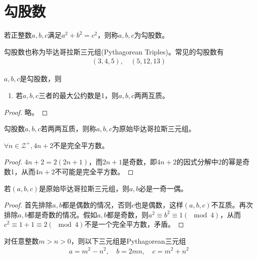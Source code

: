 
\chapter{勾股数}
\label{chap:pythagorean_triples}

\begin{definition}[勾股数]
  若正整数$a,b,c$满足$a^2+b^2=c^2$，则称$a,b,c$为勾股数。
\end{definition}

勾股数也称为毕达哥拉斯三元组(Pythagorean Triples)。常见的勾股数有
\begin{align*}
  (3,4,5),\quad (5,12,13)
\end{align*}

\begin{property}
  $a,b,c$是勾股数，则
  \begin{enumerate}
  \item 若$a,b,c$三者的最大公约数是1，则$a,b,c$两两互质。
  \end{enumerate}
\end{property}

\begin{proof}
  略。
\end{proof}

\begin{definition}
  勾股数$a,b,c$若两两互质，则称$a,b,c$为原始毕达哥拉斯三元组。
\end{definition}

\begin{lemma}
  $\forall n\in\mathcal{Z}^+, 4n+2$不是完全平方数。
\end{lemma}

\begin{proof}
  $4n+2=2(2n+1)$，而$2n+1$是奇数，即$4n+2$的因式分解中2的幂是奇数1，从而$4n+2$不可能是完全平方数。
\end{proof}

\begin{lemma}
  若$(a,b,c)$是原始毕达哥拉斯三元组，则$a,b$必是一奇一偶。
\end{lemma}

\begin{proof}
  首先排除$a,b$都是偶数的情况，否则$c$也是偶数，这样$(a,b,c)$不互质。再次排除$a,b$都是奇数的情况。假如$a,b$都是奇数，则$a^2\equiv b^2\equiv 1(\mod 4)$，从而$c^2\equiv 1 + 1\equiv 2(\mod 4)$不是一个完全平方数，矛盾。
\end{proof}

\begin{theorem}
  对任意整数$m>n>0$，则以下三元组是Pythagorean三元组
  \begin{align*}
    a=m^2-n^2,\quad b=2mn,\quad c=m^2+n^2
  \end{align*}
\end{theorem}

